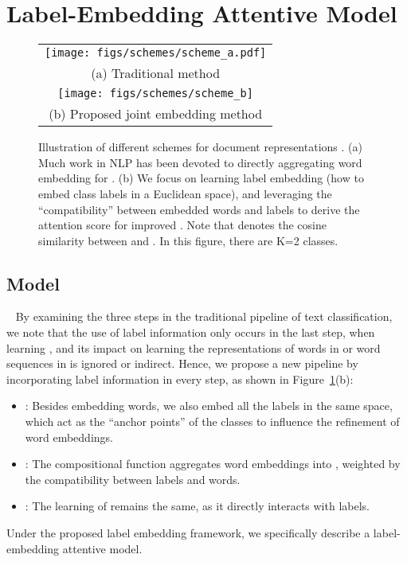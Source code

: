 \documentclass[11pt,a4paper]{article}
\begin{document}
\section{Label-Embedding Attentive Model}
\begin{figure}[t!] \centering
	\vspace{-0mm}
	\begin{tabular}{c}		
		\texttt{[image: figs/schemes/scheme\_a.pdf]} \\
		(a) Traditional method  \vspace{2mm}  \\
		\texttt{[image: figs/schemes/scheme\_b]}   \\
		(b) Proposed joint embedding method \hspace{-0mm}
	\end{tabular}
	\vspace{-0mm}
	\caption{Illustration of different schemes for document representations . 
		(a) Much work in NLP has been devoted to directly aggregating word embedding  for . (b) We focus on learning label embedding  (how to embed class labels in a Euclidean space), and leveraging the ``compatibility''  between embedded words and labels to derive the attention score  for improved .
		Note that  denotes the cosine similarity between  and . In this figure, there are K=2 classes. }
	\vspace{-0mm}
	\label{fig:model_arch}
\end{figure}

\subsection{Model}~\label{sec:model}
By examining the three steps in the traditional pipeline of text classification, we note that the use of label information only occurs in the last step, when learning , and its impact on learning the representations of words in  or word sequences in  is ignored or indirect. Hence, we propose a new pipeline by incorporating label information in every step, as shown in Figure~\ref{fig:model_arch}(b):
\begin{itemize}
	\item : Besides embedding words, we also embed all the labels in the same space, which act as the ``anchor points'' of the classes to influence the refinement of word embeddings.
\item : The compositional function aggregates word embeddings into , weighted by the compatibility between labels and words.
\item : The learning of  remains the same, as it directly interacts with labels.
\end{itemize}
Under the proposed label embedding framework, we specifically describe a label-embedding attentive model.
\end{document}
